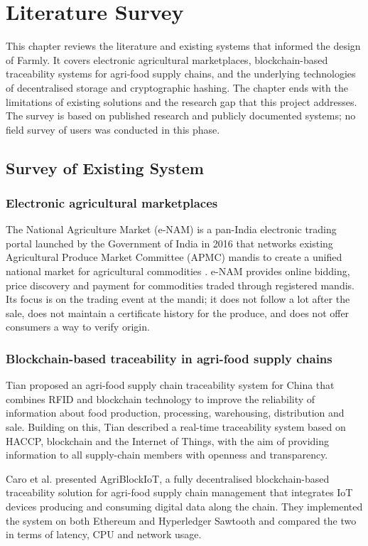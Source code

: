 \chapter{Literature Survey}
This chapter reviews the literature and existing systems that informed the design of Farmly. It covers electronic agricultural marketplaces, blockchain-based traceability systems for agri-food supply chains, and the underlying technologies of decentralised storage and cryptographic hashing. The chapter ends with the limitations of existing solutions and the research gap that this project addresses. The survey is based on published research and publicly documented systems; no field survey of users was conducted in this phase.

\section{Survey of Existing System}

\subsection*{Electronic agricultural marketplaces}
The National Agriculture Market (e-NAM) is a pan-India electronic trading portal launched by the Government of India in 2016 that networks existing Agricultural Produce Market Committee (APMC) mandis to create a unified national market for agricultural commodities \cite{enam}. e-NAM provides online bidding, price discovery and payment for commodities traded through registered mandis. Its focus is on the trading event at the mandi; it does not follow a lot after the sale, does not maintain a certificate history for the produce, and does not offer consumers a way to verify origin.

\subsection*{Blockchain-based traceability in agri-food supply chains}
Tian \cite{tian2016} proposed an agri-food supply chain traceability system for China that combines RFID and blockchain technology to improve the reliability of information about food production, processing, warehousing, distribution and sale. Building on this, Tian \cite{tian2017} described a real-time traceability system based on HACCP, blockchain and the Internet of Things, with the aim of providing information to all supply-chain members with openness and transparency.

Caro et al. \cite{caro2018} presented AgriBlockIoT, a fully decentralised blockchain-based traceability solution for agri-food supply chain management that integrates IoT devices producing and consuming digital data along the chain. They implemented the system on both Ethereum and Hyperledger Sawtooth and compared the two in terms of latency, CPU and network usage.


